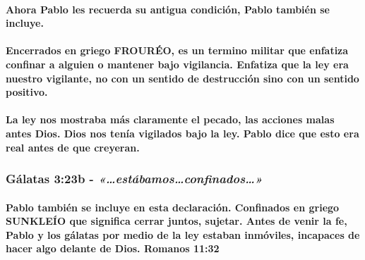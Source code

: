 \documentclass[11a pt,twoside]{article}
\newcommand{\scripture}[1]{%
  {\fontsize{12pt}{16pt}\selectfont\ScriptureFont\itshape #1}%
}
\let\oldsubsubsection\subsubsection
\renewcommand{\subsubsection}{\needspace{4\baselineskip}\oldsubsubsection}
\let\oldparagraph\paragraph
\renewcommand{\paragraph}{\needspace{3\baselineskip}\oldparagraph}
\begin{document}
\paragraph{Ahora Pablo les recuerda su antigua condición, Pablo también
se
incluye.}\label{ahora-pablo-les-recuerda-su-antigua-condiciuxf3n-pablo-tambiuxe9n-se-incluye.}

\paragraph{Encerrados en griego FROURÉO, es un termino militar que
enfatiza confinar a alguien o mantener bajo vigilancia. Enfatiza que la
ley era nuestro vigilante, no con un sentido de destrucción sino con un
sentido
positivo.}\label{encerrados-en-griego-frouruxe9o-es-un-termino-militar-que-enfatiza-confinar-a-alguien-o-mantener-bajo-vigilancia.-enfatiza-que-la-ley-era-nuestro-vigilante-no-con-un-sentido-de-destrucciuxf3n-sino-con-un-sentido-positivo.}

\paragraph{La ley nos mostraba más claramente el pecado, las acciones
malas antes Dios. Dios nos tenía vigilados bajo la ley. Pablo dice que
esto era real antes de que
creyeran.}\label{la-ley-nos-mostraba-muxe1s-claramente-el-pecado-las-acciones-malas-antes-dios.-dios-nos-tenuxeda-vigilados-bajo-la-ley.-pablo-dice-que-esto-era-real-antes-de-que-creyeran.}

\subsubsection{\texorpdfstring{Gálatas 3:23b -
\scripture{«…estábamos…confinados…»}}{Gálatas 3:23b - }}\label{guxe1latas-323b---estuxe1bamosconfinados}

\paragraph{Pablo también se incluye en esta declaración. Confinados en
griego SUNKLEÍO que significa cerrar juntos, sujetar. Antes de venir la
fe, Pablo y los gálatas por medio de la ley estaban inmóviles, incapaces
de hacer algo delante de Dios. Romanos
11:32}\label{pablo-tambiuxe9n-se-incluye-en-esta-declaraciuxf3n.-confinados-en-griego-sunkleuxedo-que-significa-cerrar-juntos-sujetar.-antes-de-venir-la-fe-pablo-y-los-guxe1latas-por-medio-de-la-ley-estaban-inmuxf3viles-incapaces-de-hacer-algo-delante-de-dios.-romanos-1132}
\end{document}
